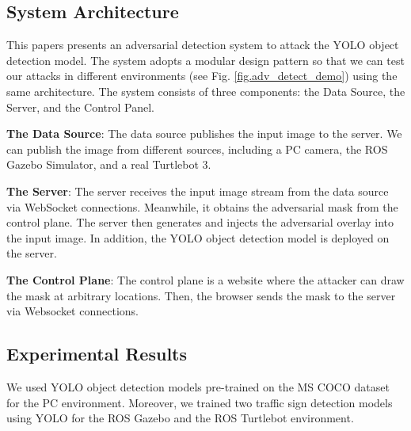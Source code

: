 

\subsection{System Architecture}

This papers presents an adversarial detection system to attack the YOLO object detection model. The system adopts a modular design pattern so that we can test our attacks in different environments (see Fig. \ref{fig.adv_detect_demo}) using the same architecture. The system consists of three components: the Data Source, the Server, and the Control Panel.

\textbf{The Data Source}: The data source publishes the input image to the server. We can publish the image from different sources, including a PC camera, the ROS Gazebo Simulator, and a real Turtlebot 3.

\textbf{The Server}: The server receives the input image stream from the data source via WebSocket connections. Meanwhile, it obtains the adversarial mask from the control plane. The server then generates and injects the adversarial overlay into the input image. In addition, the YOLO object detection model is deployed on the server.

\textbf{The Control Plane}: The control plane is a website where the attacker can draw the mask at arbitrary locations. Then, the browser sends the mask to the server via Websocket connections.


\clearpage

\subsection{Experimental Results}

We used YOLO object detection models pre-trained on the MS COCO dataset for the PC environment. Moreover, we trained two traffic sign detection models using YOLO for the ROS Gazebo and the ROS Turtlebot environment. 

